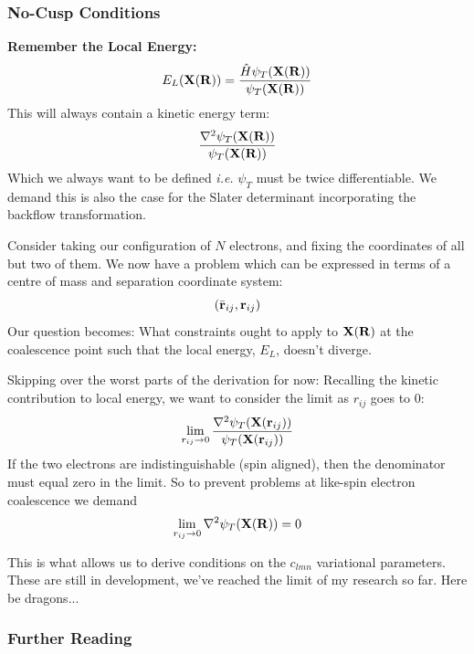 \documentclass[10pt]{beamer}
\begin{document}
\begin{frame}[allowframebreaks]
    \frametitle{No-Cusp Conditions}
    \textbf{Remember the Local Energy:}
    \begin{equation}
        E_L\pqty{\vb{X}\pqty{\vb{R}}}=\frac{
            \hat{H}\psi_T\pqty{\vb{X}\pqty{\vb{R}}}
        }{
            \psi_T\pqty{\vb{X}\pqty{\vb{R}}}
        }
    \end{equation}
    This will always contain a kinetic energy term:
    \begin{equation}
        \frac{
            \laplacian\psi_T\pqty{\vb{X}\pqty{\vb{R}}}
        }{
            \psi_T\pqty{\vb{X}\pqty{\vb{R}}}
        }
    \end{equation}
    Which we always want to be defined \textit{i.e.} $\psi_T$ must be twice
    differentiable. We demand this is also the case for the Slater determinant
    incorporating the backflow transformation.
    \framebreak

    Consider taking our configuration of $N$ electrons, and fixing the
    coordinates of all but two of them. We now have a problem which can be
    expressed in terms of a centre of mass and separation coordinate system:
    \begin{equation*}
        \pqty{\bar{\vb{r}}_{ij},\vb{r}_{ij}}
    \end{equation*}
    Our question becomes: What constraints ought to apply to
    $\vb{X}\pqty{\vb{R}}$ at the coalescence point such that the local energy,
    $E_L$, doesn't diverge.
    \framebreak

    Skipping over the worst parts of the derivation for now:\newline
    Recalling the kinetic contribution to local energy, we want to consider
    the limit as $r_{ij}$ goes to $0$:
    \begin{equation}
        \lim\limits_{r_{ij}\to 0}\frac{
            \laplacian\psi_T\pqty{\vb{X}\pqty{\vb{r}_{ij}}}
        }{
            \psi_T\pqty{\vb{X}\pqty{\vb{r}_{ij}}}
        }
    \end{equation}
    If the two electrons are indistinguishable (spin aligned), then the
    denominator must equal zero in the limit.\medskip\newline
    So to prevent problems at like-spin electron coalescence we demand
    \begin{equation}
        \lim\limits_{r_{ij}\to 0}\laplacian\psi_T\pqty{\vb{X}\pqty{\vb{R}}}=0
    \end{equation}
    \framebreak

    This is what allows us to derive conditions on the $c_{lmn}$ variational
    parameters. These are still in development, we've reached the limit of my
    research so far.\medskip\newline
    Here be dragons...
\end{frame}


\begin{frame}[allowframebreaks]
    \frametitle{Further Reading}
    
    

\end{frame}
\end{document}
